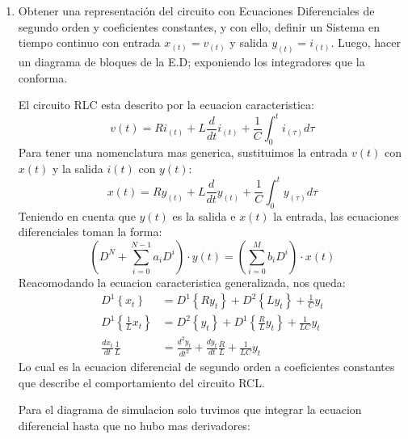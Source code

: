 \documentclass[12pt,a4paper]{report}
\begin{document}
  \begin{enumerate}[label=\alph*)]
  \item Obtener una representación del circuito con Ecuaciones Diferenciales de segundo orden y coeficientes constantes,
    y con ello, definir un Sistema en tiempo continuo con entrada $x_{(t)} = v_{(t)}$ y salida $y_{(t)} = i_{(t)}$. Luego,
    hacer un diagrama de bloques de la E.D; exponiendo los integradores que la conforma.
    
    El circuito RLC esta descrito por la ecuacion caracteristica:
    \begin{equation*}
      v(t) = Ri_{(t)} + L \frac{d}{dt} i_{(t)} + \frac{1}{C} \int_{0}^{t} i_{(\tau)} d\tau
    \end{equation*}
    Para tener una nomenclatura mas generica, sustituimos la entrada $v(t)$ con $x(t)$ y la salida $i(t)$ con $y(t)$:
    \begin{equation*}
      x(t) = Ry_{(t)} + L \frac{d}{dt} y_{(t)} + \frac{1}{C} \int_{0}^{t} y_{(\tau)} d\tau
    \end{equation*}
    Teniendo en cuenta que $y(t)$ es la salida e $x(t)$ la entrada, las ecuaciones diferenciales toman la forma:
    \begin{equation*}
      \left(D^N + \sum_{i=0}^{N-1} a_i D^i\right) \cdot y(t) = \left(\sum_{i=0}^{M} b_i D^i\right) \cdot x(t)
    \end{equation*}
    Reacomodando la ecuacion caracteristica generalizada, nos queda:
    \begin{align*}
      D^1\left\{x_t\right\} &= D^1\left\{R y_t\right\} + D^2\left\{L y_t\right\} + \frac{1}{C} y_t\\[6pt]
      D^1\left\{\frac{1}{L} x_t\right\} &= D^2\left\{y_t\right\} + D^1\left\{\frac{R}{L} y_t\right\} + \frac{1}{LC} y_t\\[6pt]
      \frac{dx_t}{dt} \frac{1}{L} &= \frac{d^2 y_t}{dt^2} + \frac{dy_t}{dt} \frac{R}{L} + \frac{1}{LC} y_t
    \end{align*}
    Lo cual es la ecuacion diferencial de segundo orden a coeficientes constantes que describe el comportamiento
    del circuito RCL.

    Para el diagrama de simulacion solo tuvimos que integrar la ecuacion diferencial hasta que no hubo mas derivadores:
      
    \begin{figure}[h]
      \centering
\end{figure}
\end{enumerate}
\end{document}

